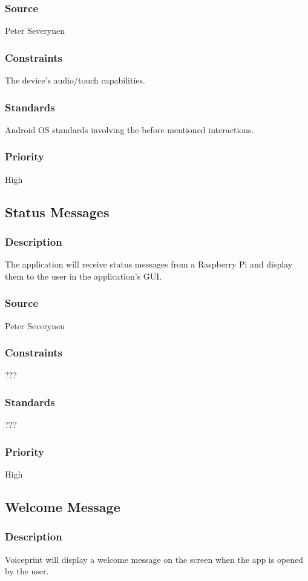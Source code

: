\subsubsection{Source}
Peter Severynen
\subsubsection{Constraints}
The device's audio/touch capabilities.
\subsubsection{Standards}
Android OS standards involving the before mentioned interactions.
\subsubsection{Priority}
High
\subsection{Status Messages}
\subsubsection{Description}
The application will receive status messages from a Raspberry Pi and display them to the user in the application's GUI.
\subsubsection{Source}
Peter Severynen
\subsubsection{Constraints}
???
\subsubsection{Standards}
???
\subsubsection{Priority}
High
\subsection{Welcome Message}
\subsubsection{Description}
Voiceprint will display a welcome message on the screen when the app is opened by the user.

